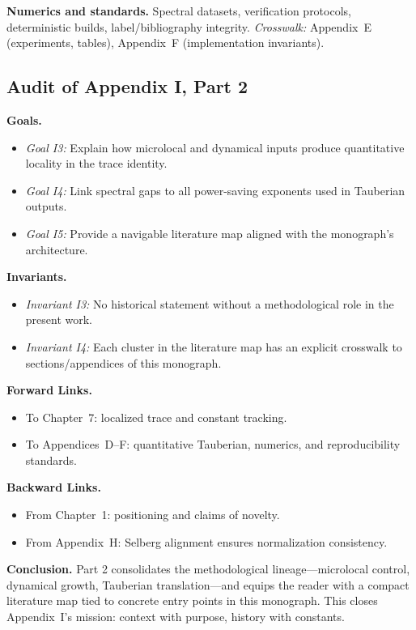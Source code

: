 \medskip\noindent
\textbf{Numerics and standards.}
Spectral datasets, verification protocols, deterministic builds, label/bibliography integrity.  
\emph{Crosswalk:} Appendix~E (experiments, tables), Appendix~F (implementation invariants).

\subsection*{Audit of Appendix I, Part 2}
\noindent\textbf{Goals.}
\begin{itemize}
  \item \emph{Goal I3:} Explain how microlocal and dynamical inputs produce quantitative locality in the trace identity. 
  \item \emph{Goal I4:} Link spectral gaps to all power-saving exponents used in Tauberian outputs. 
  \item \emph{Goal I5:} Provide a navigable literature map aligned with the monograph’s architecture.
\end{itemize}

\noindent\textbf{Invariants.}
\begin{itemize}
  \item \emph{Invariant I3:} No historical statement without a methodological role in the present work.
  \item \emph{Invariant I4:} Each cluster in the literature map has an explicit crosswalk to sections/appendices of this monograph.
\end{itemize}

\noindent\textbf{Forward Links.}
\begin{itemize}
  \item To Chapter~7: localized trace and constant tracking.
  \item To Appendices~D–F: quantitative Tauberian, numerics, and reproducibility standards.
\end{itemize}

\noindent\textbf{Backward Links.}
\begin{itemize}
  \item From Chapter~1: positioning and claims of novelty.
  \item From Appendix~H: Selberg alignment ensures normalization consistency.
\end{itemize}

\bigskip
\noindent\textbf{Conclusion.}
Part 2 consolidates the methodological lineage—microlocal control, dynamical growth, Tauberian translation—and equips the reader with a compact literature map tied to concrete entry points in this monograph. This closes Appendix~I’s mission: context with purpose, history with constants.
